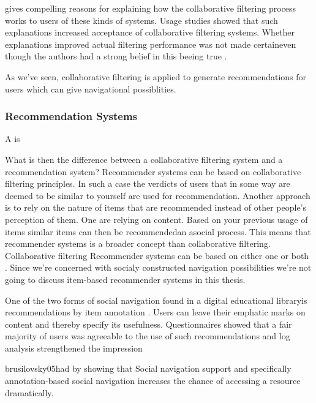 \citet[]{herlocker00} gives compelling reasons for explaining
how the collaborative filtering process works to users of these kinds of
systems. Usage studies showed that such explanations increased acceptance of
collaborative filtering systems. Whether explanations improved actual
filtering performance was not made certain\dash{}even though
the authors had a strong belief in this beeing true
\citep[]{herlocker00}.

As we've seen, collaborative filtering is applied to generate
recommendations for users which can give navigational possiblities.

\subsubsection{Recommendation Systems}
\label{section:background.social.navigation.applied.forms.recommendations}

A  is

What is then the difference between a collaborative
filtering system and a recommendation system?
Recommender systems can be based on collaborative filtering principles.
In such a case the verdicts of users that in some way are deemed to be similar
to  yourself are used for recommendation.
Another approach is to rely on the nature of items that are recommended
instead of other people's perception of them. One are relying on content.
Based on your previous usage of items similar items can then be
recommended\dash{}an asocial process.
This means that recommender systems is a broader concept than collaborative
filtering. Collaborative filtering 
Recommender systems can be based on either one or both
\citep[]{herlocker00}.
Since we're concerned with socialy constructed navigation possibilities we're
not going to discuss item-based recommender systems in this thesis.



%

One of the two forms of social navigation found in
\dash{}a digital educational
library\dash{}is recommendations by item
annotation \citep[]{brusilovsky05}. Users can leave their emphatic marks
on content and thereby specify its usefulness. Questionnaires showed that a
fair majority of users was agreeable to the use of such recommendations
\citeyearpar[]{brusilovsky05} and log analysis strengthened
the impression
\begin{fullquote}[\p{38}]{brusilovsky05}{had by showing that}
  Social navigation support and specifically
  annotation-based social navigation increases the chance of
  accessing a resource dramatically.
\end{fullquote}

